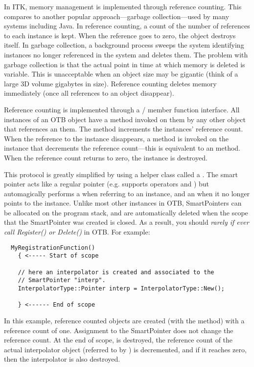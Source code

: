 In ITK, memory management is implemented through reference counting. This
compares to another popular approach---garbage collection---used
 by many
systems including Java. In reference counting, a count of the number of
references to each instance is kept. When the reference goes to zero, the
object destroys itself. In garbage collection, a background process sweeps
the system identifying instances no longer referenced in the system and
deletes them. The problem with garbage collection is that the actual point in
time at which memory is deleted is variable. This is unacceptable when an
object size may be gigantic (think of a large 3D volume gigabytes in
size). Reference counting deletes memory immediately (once all references to
an object disappear).

Reference counting is implemented through a /
member function interface.  All instances of an OTB object have a
 method invoked on them by any other object that references
an them. The  method increments the instances' reference
count. When the reference to the instance disappears, a 
method is invoked on the instance that decrements the reference count---this
is equivalent to an  method. When the reference count
returns to zero, the instance is destroyed.

This protocol is greatly simplified by using a helper class called a
. The smart pointer acts like a regular pointer
(e.g. supports operators \code{->} and \code{*}) but automagically performs a
 when referring to an instance, and an 
when it no longer points to the instance.  Unlike most other instances in
OTB, SmartPointers can be allocated on the program stack, and are
automatically deleted when the scope that the SmartPointer was created
is closed. As a result, you should \emph{rarely if ever call Register() or
Delete()} in OTB. For example:

\small
\begin{verbatim}
  MyRegistrationFunction()
    { <----- Start of scope

    // here an interpolator is created and associated to the
    // SmartPointer "interp".
    InterpolatorType::Pointer interp = InterpolatorType::New();

    } <------ End of scope
\end{verbatim}
\normalsize

In this example, reference counted objects are created (with the 
method) with a reference count of one. Assignment to the SmartPointer
 does not change the reference count. At the end of scope,
 is destroyed, the reference count of the actual interpolator
object (referred to by ) is decremented, and if it reaches zero,
then the interpolator is also destroyed.

